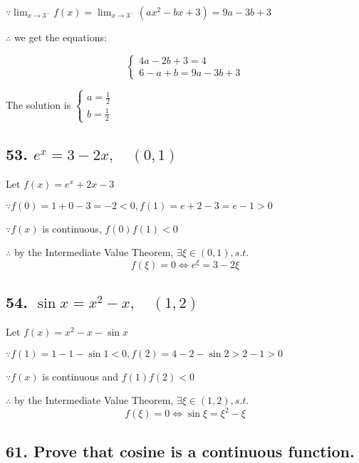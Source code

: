\documentclass{article}
\begin{document}
    $\because \lim_{x \to 3^-}f(x) = \lim_{x \to 3^-}(ax^2 - bx + 3) = 9a - 3b + 3$

    $\therefore$ we get the equations:

    \begin{equation*}
        \left \{
        \begin{aligned}
            4a - 2b + 3 = 4 \\
            6 - a + b = 9a - 3b + 3
        \end{aligned}
        \right .
    \end{equation*}

    The solution is $\left \{ \begin{aligned}
        a = \frac 1 2 \\ b = \frac 1 2
    \end{aligned} \right .$


    \subsection*{53. $e^x = 3 - 2x, \quad (0, 1)$}

    Let $f(x) = e^x + 2x - 3$

    $\because f(0) = 1 + 0 - 3 = -2 < 0, f(1) = e + 2 - 3 = e - 1 > 0$

    $\because f(x)$ is continuous, $f(0)f(1) < 0$

    $\therefore$ by the Intermediate Value Theorem, $\exists \xi \in (0, 1), s.t.$ $$f(\xi) = 0  \iff e^\xi = 3 - 2\xi$$

    \subsection*{54. $\sin x = x^2 - x, \quad (1, 2)$}

    Let $f(x) = x^2 - x - \sin x$

    $\because f(1) = 1 - 1 - \sin 1 < 0, f(2) = 4 - 2 - \sin 2 > 2 - 1 > 0$

    $\because f(x)$ is continuous and $f(1)f(2) < 0$

    $\therefore$ by the Intermediate Value Theorem, $\exists \xi \in (1, 2), s.t.$ $$f(\xi) = 0 \iff \sin \xi = \xi ^2 - \xi$$

    \subsection*{61. Prove that cosine is a continuous function.}
\end{document}
